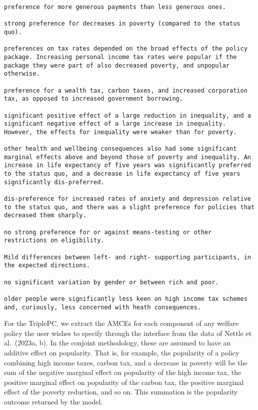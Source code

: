 \documentclass[
  letterpaper,
  DIV=11,
  numbers=noendperiod]{scrartcl}
\begin{document}
\begin{verbatim}
preference for more generous payments than less generous ones. 

strong preference for decreases in poverty (compared to the status quo). 

preferences on tax rates depended on the broad effects of the policy package. Increasing personal income tax rates were popular if the package they were part of also decreased poverty, and unpopular otherwise. 

preference for a wealth tax, carbon taxes, and increased corporation tax, as opposed to increased government borrowing. 

significant positive effect of a large reduction in inequality, and a significant negative effect of a large increase in inequality. However, the effects for inequality were weaker than for poverty. 

other health and wellbeing consequences also had some significant marginal effects above and beyond those of poverty and inequality. An increase in life expectancy of five years was significantly preferred to the status quo, and a decrease in life expectancy of five years significantly dis-preferred. 

dis-preference for increased rates of anxiety and depression relative to the status quo, and there was a slight preference for policies that decreased them sharply. 

no strong preference for or against means-testing or other restrictions on eligibility. 

Mild differences between left- and right- supporting participants, in the expected directions. 

no significant variation by gender or between rich and poor. 

older people were significantly less keen on high income tax schemes and, curiously, less concerned with heath consequences. 
\end{verbatim}

For the TriplePC, we extract the AMCEs for each component of any welfare
policy the user wishes to specify through the interface from the data of
Nettle et al.~(2023a, b). In the conjoint methodology, these are assumed
to have an additive effect on popularity. That is, for example, the
popularity of a policy combining high income taxes, carbon tax, and a
decrease in poverty will be the sum of the negative marginal effect on
popularity of the high income tax, the positive marginal effect on
popularity of the carbon tax, the positive marginal effect of the
poverty reduction, and so on. This summation is the popularity outcome
returned by the model.
\end{document}
